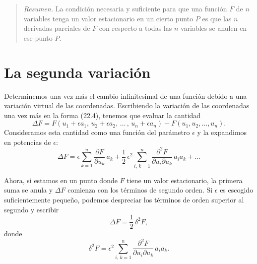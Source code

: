 \documentclass[12pt,a4paper]{book}
\begin{document}
\begin{quote}
\textit{Resumen.} La condición necesaria y suficiente para que una función $F$ de $n$ variables tenga un valor estacionario en un cierto punto $P$ es que las $n$ derivadas parciales de $F$ con respecto a todas las $n$ variables se anulen en ese punto $P$.
\end{quote}

\section{La segunda variación}

Determinemos una vez más el cambio infinitesimal de una función debido a una variación virtual de las coordenadas. Escribiendo la variación de las coordenadas una vez más en la forma (22.4), tenemos que evaluar la cantidad
\begin{equation}
\Delta F = F(u_1 + \epsilon a_1, \, u_2 + \epsilon a_2, \, \ldots \, , \, u_n + \epsilon a_n) - F(u_1, u_2, \ldots, u_n). \tag{23.1}
\end{equation}
Consideramos esta cantidad como una función del parámetro $\epsilon$ y la expandimos en potencias de $\epsilon$:
\begin{equation}
\Delta F = \epsilon \sum_{k=1}^{n} \frac{\partial F}{\partial u_k} \, a_k + \frac{1}{2} \, \epsilon^2 \sum_{i,\,k=1}^{n} \frac{\partial^2 F}{\partial u_i \partial u_k} \, a_i a_k + \ldots \tag{23.2}
\end{equation}

Ahora, si estamos en un punto donde $F$ tiene un valor estacionario, la primera suma se anula y $\Delta F$ comienza con los términos de segundo orden. Si $\epsilon$ es escogido suficientemente pequeño, podemos despreciar los términos de orden superior al segundo y escribir
\begin{equation}
\Delta F = \frac{1}{2} \, \delta^2 F, \tag{23.3}
\end{equation}
donde
\begin{equation}
\delta^2 F = \epsilon^2 \sum_{i,\,k=1}^{n} \frac{\partial^2 F}{\partial u_i \partial u_k} \, a_i a_k. \tag{23.4}
\end{equation}
\end{document}
